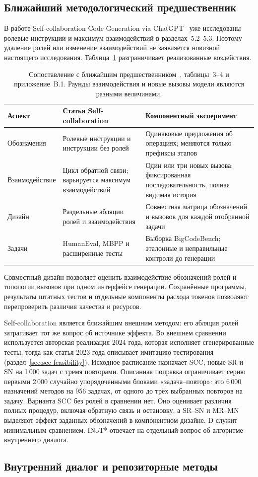 \subsection{Ближайший методологический предшественник}
В работе Self-collaboration Code Generation via ChatGPT~\cite{dong2023selfcollaboration} уже исследованы ролевые инструкции и максимум взаимодействий в разделах~5.2--5.3. Поэтому удаление ролей или изменение взаимодействий не заявляется новизной настоящего исследования. Таблица~\ref{tab:closest-method} разграничивает реализованные воздействия.

\begin{table}[htbp]\centering\small
\caption{Сопоставление с ближайшим предшественником~\cite{dong2023selfcollaboration}, таблицы~3--4 и приложение~B.1. Раунды взаимодействия и новые вызовы модели являются разными величинами.}\label{tab:closest-method}
\begin{tabular}{p{}p{}p{}}\toprule
Аспект & Статья Self-collaboration & Компонентный эксперимент\\\midrule
Обозначения & Ролевые инструкции и инструкции без ролей & Одинаковые предложения об операциях; меняются только префиксы этапов\\
Взаимодействие & Цикл обратной связи; варьируется максимум взаимодействий & Один или три новых вызова; фиксированная последовательность, полная видимая история\\
Дизайн & Раздельные абляции ролей и взаимодействия & Совместная матрица обозначений и вызовов для каждой отобранной задачи\\
Задачи & HumanEval, MBPP и расширенные тесты & Выборка BigCodeBench; эталонные и неправильные контроли до генерации\\\bottomrule
\end{tabular}\end{table}

Совместный дизайн позволяет оценить взаимодействие обозначений ролей и топологии вызовов при одном интерфейсе генерации. Сохранённые программы, результаты штатных тестов и отдельные компоненты расхода токенов позволяют перепроверить различия качества и ресурсов.

Self-collaboration является ближайшим внешним методом: его абляция ролей затрагивает тот же вопрос об источнике эффекта. Во внешнем сравнении используется авторская реализация 2024 года, которая исполняет сгенерированные тесты, тогда как статья 2023 года описывает имитацию тестирования (раздел~\ref{sec:scc-feasibility}). Исходное расписание назначает SCC, новые SR и SN на 1\,000 задач с тремя повторами. Описанная поправка ограничивает серию первыми 2\,000 случайно упорядоченными блоками «задача--повтор»: это 6\,000 назначений методов на 956 задачах, от одного до трёх выбранных повторов на задачу. Варианта SCC без ролей в сравнении нет. Оно оценивает различия полных процедур, включая обратную связь и остановку, а SR--SN и MR--MN выделяют эффект заданных обозначений в компонентном дизайне. D служит минимальным сравнением. INoT* отвечает на отдельный вопрос об алгоритме внутреннего диалога.

\subsection{Внутренний диалог и репозиторные методы}
